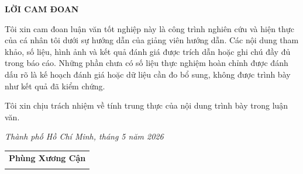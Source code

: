 \thispagestyle{empty}
\begin{center}
    \textbf{\Large LỜI CAM ĐOAN}
\end{center}

\vspace{1cm}

Tôi xin cam đoan luận văn tốt nghiệp này là công trình nghiên cứu và hiện
thực của cá nhân tôi dưới sự hướng dẫn của giảng viên hướng dẫn. Các nội dung
tham khảo, số liệu, hình ảnh và kết quả đánh giá được trích dẫn hoặc ghi chú
đầy đủ trong báo cáo. Những phần chưa có số liệu thực nghiệm hoàn chỉnh được
đánh dấu rõ là kế hoạch đánh giá hoặc dữ liệu cần đo bổ sung, không được trình
bày như kết quả đã kiểm chứng.

Tôi xin chịu trách nhiệm về tính trung thực của nội dung trình bày trong luận
văn.

\vspace{2cm}

\begin{flushright}
    \textit{Thành phố Hồ Chí Minh, tháng 5 năm 2026}\\[1cm]
    \begin{tabular}{c}
        \textbf{Phùng Xương Cận} \\[2cm]
        \hrulefill
    \end{tabular}
\end{flushright}
